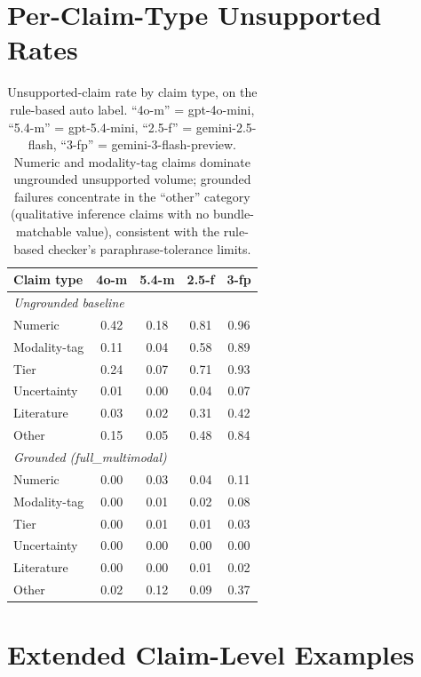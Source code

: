\documentclass[11pt]{article}
\begin{document}
\section{Per-Claim-Type Unsupported Rates}
\label{app:claim-types}

\begin{table}[h]
\centering
\small
\begin{tabular}{lcccc}
\toprule
\textbf{Claim type} & \textbf{4o-m} & \textbf{5.4-m} & \textbf{2.5-f} & \textbf{3-fp} \\
\midrule
\multicolumn{5}{l}{\emph{Ungrounded baseline}} \\
Numeric        & 0.42 & 0.18 & 0.81 & 0.96 \\
Modality-tag   & 0.11 & 0.04 & 0.58 & 0.89 \\
Tier           & 0.24 & 0.07 & 0.71 & 0.93 \\
Uncertainty    & 0.01 & 0.00 & 0.04 & 0.07 \\
Literature     & 0.03 & 0.02 & 0.31 & 0.42 \\
Other          & 0.15 & 0.05 & 0.48 & 0.84 \\
\midrule
\multicolumn{5}{l}{\emph{Grounded (full\_multimodal)}} \\
Numeric        & 0.00 & 0.03 & 0.04 & 0.11 \\
Modality-tag   & 0.00 & 0.01 & 0.02 & 0.08 \\
Tier           & 0.00 & 0.01 & 0.01 & 0.03 \\
Uncertainty    & 0.00 & 0.00 & 0.00 & 0.00 \\
Literature     & 0.00 & 0.00 & 0.01 & 0.02 \\
Other          & 0.02 & 0.12 & 0.09 & 0.37 \\
\bottomrule
\end{tabular}
\caption{Unsupported-claim rate by claim type, on the rule-based auto label. ``4o-m'' = gpt-4o-mini, ``5.4-m'' = gpt-5.4-mini, ``2.5-f'' = gemini-2.5-flash, ``3-fp'' = gemini-3-flash-preview. Numeric and modality-tag claims dominate ungrounded unsupported volume; grounded failures concentrate in the ``other'' category (qualitative inference claims with no bundle-matchable value), consistent with the rule-based checker's paraphrase-tolerance limits.}
\label{tab:ctypes}
\end{table}

\section{Extended Claim-Level Examples}
\label{app:extended-examples}
\end{document}
